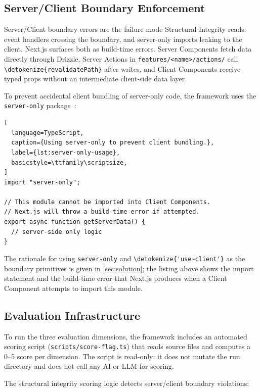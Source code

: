 \documentclass[12pt,a4paper]{report}
\newcommand{\code}[1]{\texttt{\nolinkurl{\detokenize{#1}}}}
\newcommand{\pkg}[1]{\texttt{\nolinkurl{#1}}}
\DeclareRobustCommand{\filename}[1]{\bgroup\urlstyle{tt}\nolinkurl{#1}\egroup}
\newcommand{\usec}{\code{'use~client'}}
\begin{document}
\subsection{Server/Client Boundary Enforcement}
\label{sec:server-client-boundary}

Server/Client boundary errors are the failure mode Structural Integrity reads: event handlers crossing the boundary, and server-only imports leaking to the client. Next.js surfaces both as build-time errors. Server Components fetch data directly through Drizzle, Server Actions in \filename{features/<name>/actions/} call \code{revalidatePath} after writes, and Client Components receive typed props without an intermediate client-side data layer.

To prevent accidental client bundling of server-only code, the framework uses the \pkg{server-only} package~\parencite{server-only-npm}:

\begin{lstlisting}[
  language=TypeScript,
  caption={Using server-only to prevent client bundling.},
  label={lst:server-only-usage},
  basicstyle=\ttfamily\scriptsize,
]
import "server-only";

// This module cannot be imported into Client Components.
// Next.js will throw a build-time error if attempted.
export async function getServerData() {
  // server-side only logic
}
\end{lstlisting}

\bigskip\noindent The rationale for using \pkg{server-only} and \usec{} as the boundary primitives is given in \autoref{sec:solution}; the listing above shows the import statement and the build-time error that Next.js produces when a Client Component attempts to import this module.

\subsection{Evaluation Infrastructure}
\label{sec:eval-infrastructure}

To run the three evaluation dimensions, the framework includes an automated scoring script (\filename{scripts/score-flag.ts}) that reads source files and computes a 0--5 score per dimension. The script is read-only: it does not mutate the run directory and does not call any AI or LLM for scoring.

The structural integrity scoring logic detects server/client boundary violations:
\end{document}
